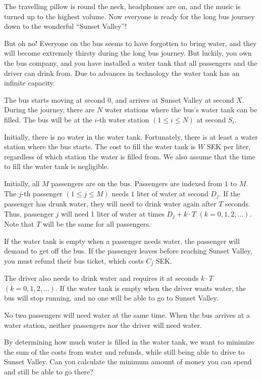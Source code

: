 \noindent
The travelling pillow is round the neck, headphones are on, and the music is turned up to the highest volume.
Now everyone is ready for the long bus journey down to the wonderful ``Sunset Valley''!

But oh no! Everyone on the bus seems to have forgotten to bring water,
and they will become extremely thirsty during the long bus journey.
But luckily, you own the bus company,
and you have installed a water tank that all passengers and the driver can drink from.
Due to advances in technology the water tank has an infinite capacity.

The bus starts moving at second $0$, and arrives at Sunset Valley at second $X$.
During the journey, there are $N$ water stations where the bus's water tank can be filled.
The bus will be at the $i$-th water station $(1 \leq i \leq N)$ at second $S_i$.

Initially, there is no water in the water tank. Fortunately, there is at least a water station where the bus starts.
The cost to fill the water tank is $W$ SEK per liter, regardless of which station the water is filled from.
We also assume that the time to fill the water tank is negligible.

Initially, all $M$ passengers are on the bus. Passengers are indexed from $1$ to $M$.
The $j$-th passenger $(1 \leq j \leq M)$ needs $1$ liter of water at second $D_j$.
If the passenger has drunk water, they will need to drink water again after $T$ seconds.
Thus, passenger $j$ will need 1 liter of water at times $D_j + k\cdot T$ $(k = 0,1,2,\ldots)$.
Note that $T$ will be the same for all passengers.

If the water tank is empty when a passenger needs water, the passenger will demand to get off the bus.
If the passenger leaves before reaching Sunset Valley, you must refund their bus ticket,
which costs $C_j$ SEK.

The driver also needs to drink water and requires it at seconds $k\cdot T$ $(k = 0,1,2,\ldots)$.
If the water tank is empty when the driver wants water, the bus will stop running, and no one will be able to go to Sunset Valley.

No two passengers will need water at the same time. When the bus arrives at a water station, neither passengers nor the driver will need water.

By determining how much water is filled in the water tank, we want to minimize the sum of the costs from water and refunds, 
while still being able to drive to Sunset Valley. Can you calculate the minimum amount of money you can spend and still be able to go there?



